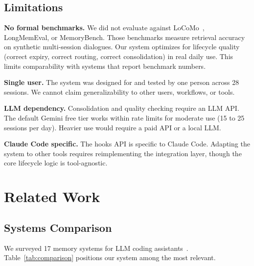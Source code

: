 \documentclass[11pt,a4paper]{article}
\begin{document}
\subsection{Limitations}

\textbf{No formal benchmarks.}
We did not evaluate against LoCoMo~\cite{maharana2024locomo}, LongMemEval, or MemoryBench.
Those benchmarks measure retrieval accuracy on synthetic multi-session dialogues.
Our system optimizes for lifecycle quality (correct expiry, correct routing, correct consolidation) in real daily use.
This limits comparability with systems that report benchmark numbers.

\textbf{Single user.}
The system was designed for and tested by one person across 28 sessions.
We cannot claim generalizability to other users, workflows, or tools.

\textbf{LLM dependency.}
Consolidation and quality checking require an LLM API.
The default Gemini free tier works within rate limits for moderate use (15 to 25 sessions per day).
Heavier use would require a paid API or a local LLM.

\textbf{Claude Code specific.}
The hooks API is specific to Claude Code.
Adapting the system to other tools requires reimplementing the integration layer, though the core lifecycle logic is tool-agnostic.


\section{Related Work}

\subsection{Systems Comparison}

We surveyed 17 memory systems for LLM coding assistants~\cite{liu2024memory, mem0paper, simplemem, memospaper}.
Table~\ref{tab:comparison} positions our system among the most relevant.
\end{document}
